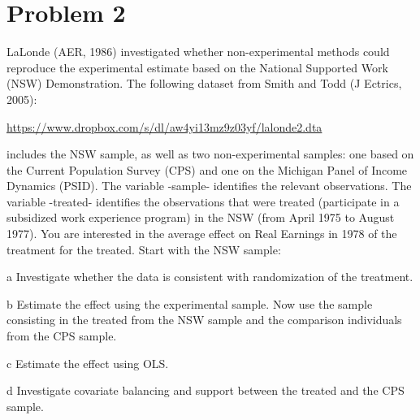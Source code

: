 \documentclass{article}
\begin{document}
\section*{Problem 2}
LaLonde (AER, 1986) investigated whether non-experimental methods could reproduce the experimental estimate based on the National Supported Work (NSW) Demonstration. The following dataset from Smith and Todd (J Ectrics, 2005):
\begin{center}
    \hyperlink{https://www.dropbox.com/s/dl/aw4yi13mz9z03yf/lalonde2.dta}{https://www.dropbox.com/s/dl/aw4yi13mz9z03yf/lalonde2.dta}
\end{center}
includes the NSW sample, as well as two non-experimental samples: one based on the Current Population Survey (CPS) and one on the Michigan Panel of Income Dynamics (PSID). The variable -sample- identifies the relevant observations. The variable -treated- identifies the observations that were treated (participate in a subsidized work experience program) in the NSW (from April 1975 to August 1977). You are interested in the average effect on Real Earnings in 1978 of the treatment for the treated. Start with the NSW sample:
\begin{problem}{a}
Investigate whether the data is consistent with randomization of the treatment.
\end{problem}
\begin{solution}
\end{solution}

\begin{problem}{b}
Estimate the effect using the experimental sample. Now use the sample consisting in the treated from the NSW sample and the comparison individuals from the CPS sample.
\end{problem}
\begin{solution}
\end{solution}

\begin{problem}{c}
Estimate the effect using OLS.
\end{problem}
\begin{solution}
\end{solution}

\begin{problem}{d}
Investigate covariate balancing and support between the treated and the CPS sample.
\end{problem}
\begin{solution}
\end{solution}
\end{document}
